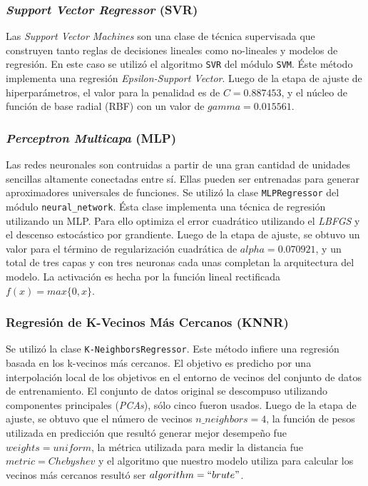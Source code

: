     \subsubsection{\textit{Support Vector Regressor} (SVR)}
      \par Las \textit{Support Vector Machines} son una clase de técnica supervisada
        que construyen tanto reglas de decisiones lineales como no-lineales
        y modelos de regresión. En este caso se utilizó el algoritmo \verb|SVR|
        del módulo \verb|SVM|. Éste método implementa una regresión
        \textit{Epsilon-Support Vector}. Luego de la etapa de ajuste de
        hiperparámetros, el valor para la penalidad es de $C = 0.887453$, y
        el núcleo de función de base radial (RBF) con un valor de
        $gamma = 0.015561$.


    \subsubsection{\textit{Perceptron Multicapa} (MLP)}
      \par Las redes neuronales son contruidas a partir de una gran cantidad
        de unidades sencillas altamente conectadas entre sí. Ellas pueden
        ser entrenadas para generar aproximadores universales de funciones.
        Se utilizó la clase \verb|MLPRegressor| del módulo \verb|neural_network|.
        Ésta clase implementa una técnica de regresión utilizando un MLP. Para
        ello optimiza el error cuadrático utilizando el \textit{LBFGS} y
        el descenso estocástico por grandiente.
        Luego de la etapa de ajuste, se obtuvo un valor para el término
        de regularización cuadrática de $alpha = 0.070921$, y un total de
        tres capas y con tres neuronas cada unas completan la arquitectura
        del modelo. La activación es hecha por la función lineal
        rectificada $f(x) = max\{0, x\}$.


    \subsubsection{Regresión de K-Vecinos Más Cercanos (KNNR)}
      \par Se utilizó la clase \verb|K-NeighborsRegressor|. Este método
        infiere una regresión basada en los k-vecinos más cercanos. El
        objetivo es predicho por una interpolación local de los objetivos
        en el entorno de vecinos del conjunto de datos de entrenamiento.
        El conjunto de datos original se descompuso utilizando componentes
        principales (\textit{PCAs}\cite{pca}), sólo cinco fueron usados. Luego de la etapa
        de ajuste, se obtuvo que el número de vecinos $n\_neighbors = 4$,
        la función de pesos utilizada en predicción que resultó generar mejor
        desempeño fue $weights = uniform$, la métrica utilizada para medir la
        distancia fue $metric = Chebyshev$ y el algoritmo que nuestro modelo
        utiliza para calcular los vecinos más cercanos resultó ser
        $algorithm = ``brute"$.


